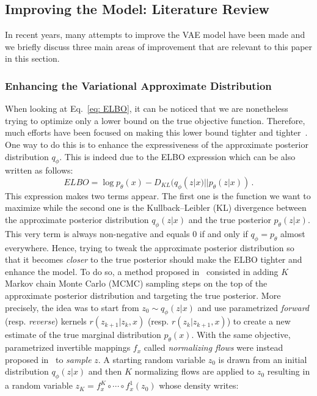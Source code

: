 \documentclass[10pt,journal,compsoc]{IEEEtran}
\begin{document}
\subsection{Improving the Model: Literature Review}

In recent years, many attempts to improve the VAE model have been made and we briefly discuss three main areas of improvement that are relevant to this paper in this section.
\subsubsection{Enhancing the Variational Approximate Distribution}\label{Subsec: Enhancing VAE}

When looking at Eq.~\eqref{eq: ELBO}, it can be noticed that we are nonetheless trying to optimize only a lower bound on the true objective function. Therefore, much efforts have been focused on making this lower bound tighter and tighter~\cite{burda_importance_2016, alemi_deep_2016,higgins_beta-vae_2017,cremer_inference_2018,zhang_advances_2018, ruiz_contrastive_2019}. One way to do this is to enhance the expressiveness of the approximate posterior distribution $q_{\phi}$. This is indeed due to the ELBO expression which can be also written as follows:
\[
    ELBO = \log p_{\theta}(x) - D_{KL}(q_{\phi}(z|x) || p_{\theta}(z|x))\,.
\]
This expression makes two terms appear. The first one is the function we want to maximize while the second one is the Kullback–Leibler (KL) divergence between the approximate posterior distribution $q_{\phi}(z|x)$ and the true posterior $p_{\theta}(z|x)$. This very term is always non-negative and equals 0 if and only if $q_{\phi} = p_{\theta}$ almost everywhere. Hence, trying to tweak the approximate posterior distribution so that it becomes \emph{closer} to the true posterior should make the ELBO tighter and enhance the model. To do so, a method proposed in~\cite{salimans_markov_2015} consisted in adding $K$ 
Markov chain Monte Carlo (MCMC) sampling steps on the top of the approximate posterior distribution and targeting the true posterior. More precisely, the idea was to start from $z_0 \sim q_{\phi}(z|x)$ and use parametrized \textit{forward} (resp. \textit{reverse}) kernels $r(z_{k+1}|z_k, x)$ (resp. $r(z_{k}|z_{k+1}, x)$) to create a new estimate of the true marginal distribution $p_{\theta}(x)$. With the same objective, parametrized invertible mappings $f_x$ called \textit{normalizing flows} were instead proposed in~\cite{rezende_variational_2015} to \emph{sample} $z$. A starting random variable $z_0$ is drawn from an initial distribution $q_{\phi}(z|x)$ and then $K$ normalizing flows are applied to $z_0$ resulting in a random variable $z_K = f_x^K \circ \cdots \circ f_x^1(z_0) $ whose density writes:
\end{document}
